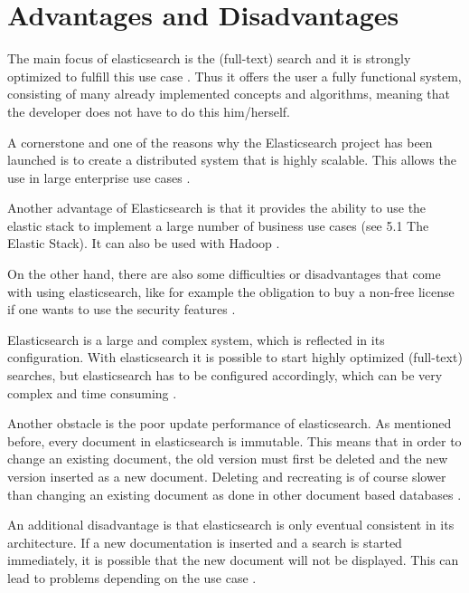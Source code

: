 \chapter{Advantages and Disadvantages}

The main focus of elasticsearch is the (full-text) search and it is strongly optimized to fulfill this use case \autocite{andrewcholakian2019}. Thus it offers the user a fully functional system, consisting of many already implemented concepts and algorithms, meaning that the developer does not have to do this him/herself.

A cornerstone and one of the reasons why the Elasticsearch project has been launched is to create a distributed system that is highly scalable. This allows the use in large enterprise use cases \autocite{shaybanon2019}.

Another advantage of Elasticsearch is that it provides the ability to use the elastic stack to implement a large number of business use cases (see 5.1 The Elastic Stack). It can also be used with Hadoop \autocite{elasticsearch_hadoop}.


On the other hand, there are also some difficulties or disadvantages that come with using elasticsearch, like for example the obligation to buy a non-free license if one wants to use the security features \autocite{elasticsearc_sec}.

Elasticsearch is a large and complex system, which is reflected in its configuration. With elasticsearch it is possible to start highly optimized (full-text) searches, but elasticsearch has to be configured accordingly, which can be very complex and time consuming \autocite{logz.io2019}.

Another obstacle is the poor update performance of elasticsearch. As mentioned before, every document in elasticsearch is immutable. This means that in order to change an existing document, the old version must first be deleted and the new version inserted as a new document. Deleting and recreating is of course slower than changing an existing document as done in other document based databases \autocite{elasticsearchb.v.2019}.

An additional disadvantage is that elasticsearch is only eventual consistent in its architecture. If a new documentation is inserted and a search is started immediately, it is possible that the new document will not be displayed. This can lead to problems depending on the use case \autocite{sunilkappal2019}.


